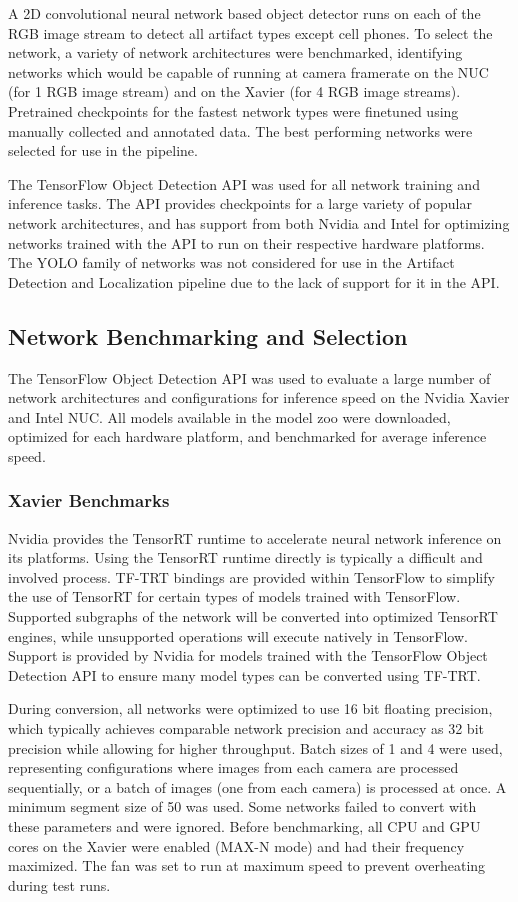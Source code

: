 A 2D convolutional neural network based object detector runs on each of the RGB image stream to detect all artifact types except cell phones. To select the network, a variety of network architectures were benchmarked, identifying networks which would be capable of running at camera framerate on the NUC (for 1 RGB image stream) and on the Xavier (for 4 RGB image streams). Pretrained checkpoints for the fastest network types were finetuned using manually collected and annotated data. The best performing networks were selected for use in the pipeline.

The TensorFlow Object Detection API was used for all network training and inference tasks. The API provides checkpoints for a large variety of popular network architectures, and has support from both Nvidia and Intel for optimizing networks trained with the API to run on their respective hardware platforms. The YOLO family of networks was not considered for use in the Artifact Detection and Localization pipeline due to the lack of support for it in the API.

\subsection{Network Benchmarking and Selection}

The TensorFlow Object Detection API was used to evaluate a large number of network architectures and configurations for inference speed on the Nvidia Xavier and Intel NUC. All models available in the model zoo were downloaded, optimized for each hardware platform, and benchmarked for average inference speed. 

\subsubsection{Xavier Benchmarks}

Nvidia provides the TensorRT runtime to accelerate neural network inference on its platforms. Using the TensorRT runtime directly is typically a difficult and involved process. TF-TRT bindings are provided within TensorFlow to simplify the use of TensorRT for certain types of models trained with TensorFlow. Supported subgraphs of the network will be converted into optimized TensorRT engines, while unsupported operations will execute natively in TensorFlow. Support is provided by Nvidia for models trained with the TensorFlow Object Detection API to ensure many model types can be converted using TF-TRT. 

During conversion, all networks were optimized to use 16 bit floating precision, which typically achieves comparable network precision and accuracy as 32 bit precision while allowing for higher throughput. Batch sizes of 1 and 4 were used, representing configurations where images from each camera are processed sequentially, or a batch of images (one from each camera) is processed at once. A minimum segment size of 50 was used. Some networks failed to convert with these parameters and were ignored. Before benchmarking, all CPU and GPU cores on the Xavier were enabled (MAX-N mode) and had their frequency maximized. The fan was set to run at maximum speed to prevent overheating during test runs. 

